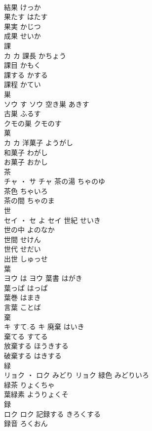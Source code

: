 \documentclass[8pt]{extreport}
\begin{document}
\begin{CJK}{UTF8}{min}
\\	結果	けっか	
\\	果たす	はたす	
\\	果実	かじつ	
\\	成果	せいか	
\\	課	
\\	カ		カ	課長	かちょう	
\\	課目	かもく	
\\	課する	かする	
\\	課程	かてい	
\\	巣	
\\	ソウ	す	ソウ	空き巣	あきす	
\\	古巣	ふるす	
\\	クモの巣	クモのす	
\\	菓	
\\	カ		カ	洋菓子	ようがし	
\\	和菓子	わがし	
\\	お菓子	おかし	
\\	茶	
\\	チャ ・ サ		チャ													茶の湯	ちゃのゆ	
\\	茶色	ちゃいろ	
\\	茶の間	ちゃのま	
\\	世	
\\	セイ ・ セ	よ	セイ	世紀	せいき	
\\	世の中	よのなか	
\\	世間	せけん	
\\	世代	せだい	
\\	出世	しゅっせ	
\\	葉	
\\	ヨウ	は	ヨウ	葉書	はがき	
\\	葉っぱ	はっぱ	
\\	葉巻	はまき	
\\	言葉	ことば	
\\	棄	
\\	キ	すて.る	キ	廃棄	はいき	
\\	棄てる	すてる	
\\	放棄する	ほうきする	
\\	破棄する	はきする	
\\	緑	
\\	リョク ・ ロク	みどり	リョク	緑色	みどりいろ	
\\	緑茶	りょくちゃ	
\\	葉緑素	ようりょくそ	
\\	録	
\\	ロク		ロク	記録する	きろくする	
\\	録音	ろくおん	

\end{CJK}
\end{document}
